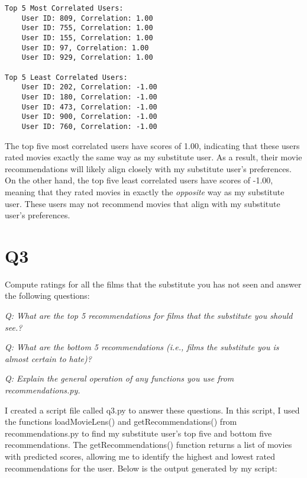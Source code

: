\documentclass[12pt]{article}
\begin{document}
\clearpage

\begin{verbatim}
Top 5 Most Correlated Users:
    User ID: 809, Correlation: 1.00
    User ID: 755, Correlation: 1.00
    User ID: 155, Correlation: 1.00
    User ID: 97, Correlation: 1.00
    User ID: 929, Correlation: 1.00

Top 5 Least Correlated Users:
    User ID: 202, Correlation: -1.00
    User ID: 180, Correlation: -1.00
    User ID: 473, Correlation: -1.00
    User ID: 900, Correlation: -1.00
    User ID: 760, Correlation: -1.00
\end{verbatim}

The top five most correlated users have scores of 1.00, indicating that these users rated movies exactly the same way as my substitute user. As a result, their movie recommendations will likely align closely with my substitute user's preferences. On the other hand, the top five least correlated users have scores of -1.00, meaning that they rated movies in exactly the \emph{opposite} way as my substitute user. These users may not recommend movies that align with my substitute user's preferences.


\section*{Q3}

Compute ratings for all the films that the substitute you has not seen and answer the following questions:

\emph{Q: What are the top 5 recommendations for films that the substitute you should see.?}

\emph{Q: What are the bottom 5 recommendations (i.e., films the substitute you is almost certain to hate)?}

\emph{Q: Explain the general operation of any functions you use from recommendations.py.}

I created a script file called q3.py to answer these questions. In this script, I used the functions loadMovieLens() and getRecommendations() from recommendations.py to find my substitute user's top five and bottom five recommendations. The getRecommendations() function returns a list of movies with predicted scores, allowing me to identify the highest and lowest rated recommendations for the user. Below is the output generated by my script:
\end{document}
